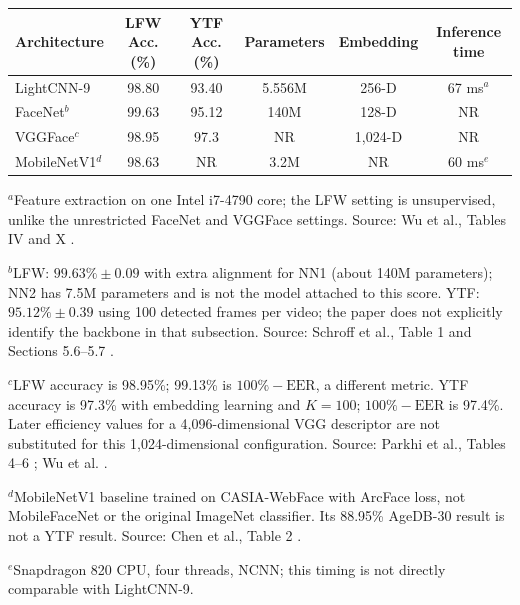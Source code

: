 \documentclass[11pt,a4paper,twocolumn]{article}
\begin{document}

\begin{strip}
\centering
{}
\label{tab:architecture_comparison}
\footnotesize
\setlength{\tabcolsep}{5pt}
\begin{tabular}{lccccc}
    \toprule
    \textbf{Architecture} & \textbf{LFW Acc. (\%)} & \textbf{YTF Acc. (\%)} & \textbf{Parameters} & \textbf{Embedding} & \textbf{Inference time} \\
    \midrule
    LightCNN-9 & 98.80 & 93.40 & 5.556M & 256-D & 67 ms$^{a}$ \\
    FaceNet$^{b}$ & 99.63 & 95.12 & 140M & 128-D & NR \\
    VGGFace$^{c}$ & 98.95 & 97.3 & NR & 1,024-D & NR \\
    MobileNetV1$^{d}$ & 98.63 & NR & 3.2M & NR & 60 ms$^{e}$ \\
    \bottomrule
\end{tabular}
\vspace{1pt}
\begin{minipage}{0.98\textwidth}
\footnotesize
\setlength{\parindent}{0pt}
\setlength{\parskip}{1pt}
\setlength{\baselineskip}{9pt}
$^{a}$Feature extraction on one Intel i7-4790 core; the LFW setting is unsupervised, unlike the unrestricted FaceNet and VGGFace settings. Source: Wu et al., Tables IV and X \cite{wu2018lightcnn}.\par
$^{b}$LFW: $99.63\%\pm0.09$ with extra alignment for NN1 (about 140M parameters); NN2 has 7.5M parameters and is not the model attached to this score. YTF: $95.12\%\pm0.39$ using 100 detected frames per video; the paper does not explicitly identify the backbone in that subsection. Source: Schroff et al., Table 1 and Sections 5.6--5.7 \cite{schroff2015facenet}.\par
$^{c}$LFW accuracy is 98.95\%; 99.13\% is $100\%-\mathrm{EER}$, a different metric. YTF accuracy is 97.3\% with embedding learning and $K=100$; $100\%-\mathrm{EER}$ is 97.4\%. Later efficiency values for a 4,096-dimensional VGG descriptor are not substituted for this 1,024-dimensional configuration. Source: Parkhi et al., Tables 4--6 \cite{parkhi2015deep}; Wu et al. \cite{wu2018lightcnn}.\par
$^{d}$MobileNetV1 baseline trained on CASIA-WebFace with ArcFace loss, not MobileFaceNet or the original ImageNet classifier. Its 88.95\% AgeDB-30 result is not a YTF result. Source: Chen et al., Table 2 \cite{chen2018mobilefacenets}.\par
$^{e}$Snapdragon 820 CPU, four threads, NCNN; this timing is not directly comparable with LightCNN-9.
\end{minipage}
\end{strip}
\end{document}
